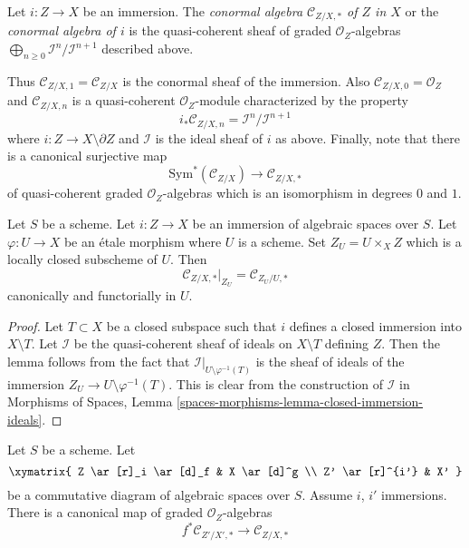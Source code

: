 \begin{definition}
\label{definition-conormal-algebra}
Let $i : Z \to X$ be an immersion. The {\it conormal algebra
$\mathcal{C}_{Z/X, *}$ of $Z$ in $X$} or the {\it conormal algebra of $i$}
is the quasi-coherent sheaf of graded $\mathcal{O}_Z$-algebras
$\bigoplus_{n \geq 0} \mathcal{I}^n/\mathcal{I}^{n + 1}$ described above.
\end{definition}

\noindent
Thus $\mathcal{C}_{Z/X, 1} = \mathcal{C}_{Z/X}$ is the conormal sheaf
of the immersion. Also $\mathcal{C}_{Z/X, 0} = \mathcal{O}_Z$ and
$\mathcal{C}_{Z/X, n}$ is a quasi-coherent $\mathcal{O}_Z$-module
characterized by the property
\begin{equation}
\label{equation-conormal-in-degree-n}
i_*\mathcal{C}_{Z/X, n} = \mathcal{I}^n/\mathcal{I}^{n + 1}
\end{equation}
where $i : Z \to X \setminus \partial Z$ and $\mathcal{I}$ is the ideal
sheaf of $i$ as above. Finally, note that there is a canonical surjective map
\begin{equation}
\label{equation-conormal-algebra-quotient}
\text{Sym}^*(\mathcal{C}_{Z/X}) \longrightarrow \mathcal{C}_{Z/X, *}
\end{equation}
of quasi-coherent graded $\mathcal{O}_Z$-algebras which is an isomorphism
in degrees $0$ and $1$.

\begin{lemma}
\label{lemma-etale-conormal-algebra}
Let $S$ be a scheme. Let $i : Z \to X$ be an immersion of algebraic spaces
over $S$. Let $\varphi : U \to X$ be an \'etale morphism where $U$ is a
scheme. Set $Z_U = U \times_X Z$ which is a locally closed subscheme of $U$.
Then
$$
\mathcal{C}_{Z/X, *}|_{Z_U} = \mathcal{C}_{Z_U/U, *}
$$
canonically and functorially in $U$.
\end{lemma}

\begin{proof}
Let $T \subset X$ be a closed subspace such that $i$ defines a closed
immersion into $X \setminus T$. Let $\mathcal{I}$ be the quasi-coherent
sheaf of ideals on $X \setminus T$ defining $Z$. Then the lemma follows
from the fact that
$\mathcal{I}|_{U \setminus \varphi^{-1}(T)}$ is the sheaf of ideals of
the immersion $Z_U \to U \setminus \varphi^{-1}(T)$.
This is clear from the construction of $\mathcal{I}$ in
Morphisms of Spaces, Lemma
\ref{spaces-morphisms-lemma-closed-immersion-ideals}.
\end{proof}

\begin{lemma}
\label{lemma-conormal-algebra-functorial}
Let $S$ be a scheme. Let
$$
\xymatrix{
Z \ar[r]_i \ar[d]_f & X \ar[d]^g \\
Z' \ar[r]^{i'} & X'
}
$$
be a commutative diagram of algebraic spaces over $S$.
Assume $i$, $i'$ immersions. There is a canonical map
of graded $\mathcal{O}_Z$-algebras
$$
f^*\mathcal{C}_{Z'/X', *}
\longrightarrow
\mathcal{C}_{Z/X, *}
$$
\end{lemma}

